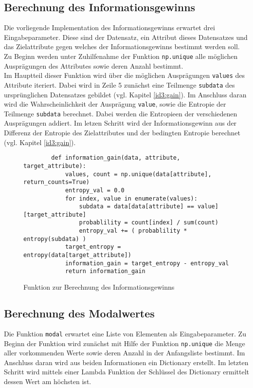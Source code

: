 \subsection{Berechnung des Informationsgewinns}
\label{id3:implementation-ig}
Die vorliegende Implementation des Informationsgewinns erwartet drei Eingabeparameter. Diese sind der Datensatz, ein Attribut dieses Datensatzes und das Zielattribute gegen welches der Informationsgewinns bestimmt werden soll. Zu Beginn werden unter Zu­hil­fe­nah­me der Funktion \texttt{np.unique} alle möglichen Ausprägungen des Attributes sowie deren Anzahl bestimmt.\\
Im Hauptteil dieser Funktion wird über die möglichen Ausprägungen \texttt{values} des Attribute iteriert. Dabei wird in Zeile 5 zunächst eine Teilmenge \texttt{subdata} des ursprünglichen Datensatzes gebildet (vgl. Kapitel \ref{id3:gain}). Im Anschluss daran wird die Wahrscheinlichkeit der Ausprägung \texttt{value}, sowie die Entropie der Teilmenge \texttt{subdata} berechnet. Dabei werden die Entropieen der verschiedenen Ausprägungen addiert. Im letzen Schritt wird der Informationsgewinn aus der Differenz der Entropie des Zielattributes und der bedingten Entropie berechnet (vgl. Kapitel \ref{id3:gain}).

\begin{figure}[H]
    \centering
    \begin{verbatim}
        def information_gain(data, attribute, target_attribute):
            values, count = np.unique(data[attribute], return_counts=True)
            entropy_val = 0.0
            for index, value in enumerate(values):
                subdata = data[data[attribute] == value][target_attribute]
                probablility = count[index] / sum(count)
                entropy_val += ( probablility * entropy(subdata) )
            target_entropy = entropy(data[target_attribute])
            information_gain = target_entropy - entropy_val
            return information_gain
    \end{verbatim}
    \caption{Funktion zur Berechnung des Informationsgewinns \autocites{PythonCourseDecisionTrees:online}{ImplementationID3}}
\end{figure}

\subsection{Berechnung des Modalwertes}
\label{id3:implementation-modal}
Die Funktion \texttt{modal} erwartet eine Liste von Elementen als Eingabeparameter. Zu Beginn der Funktion wird zunächst mit Hilfe der Funktion \texttt{np.unique} die Menge aller vorkommenden Werte sowie deren Anzahl in der Anfangsliste bestimmt. Im Anschluss daran wird aus beiden Informationen ein Dictionary erstellt. Im letzten Schritt wird mittels einer Lambda Funktion der Schlüssel des Dictionary ermittelt dessen Wert am höchsten ist.

